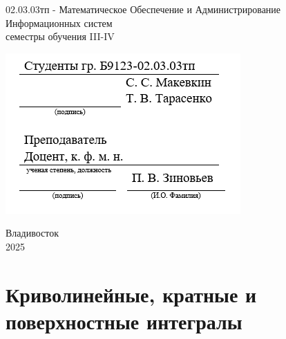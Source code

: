 \documentclass[12pt]{article}
\let\ORIincludegraphics\includegraphics
\renewcommand{\includegraphics}[2][]{\ORIincludegraphics[scale=0.65,#1]{#2}}
\begin{document}
\begin{titlepage}
\begin{center}
\begin{center}
              \normalsize{02.03.03тп - Математическое Обеспечение и Администрирование Информационных систем}\\
              \normalsize{семестры обучения III-IV}
            \end{center}
            \hfill \break
            \hfill \break
            \hfill \break
            \begin{flushright}
                \includegraphics[scale=1.5]{rospis.png}
            \end{flushright}
            \hfill \break
            
            \end{center}
            \hfill \break
            \normalsize{ 
            
            }
            \begin{center} Владивосток \\ 2025 \end{center}
            \thispagestyle{empty}
    \end{titlepage}
    \pagebreak
    \tableofcontents
    \pagebreak
  \section{Криволинейные, кратные и поверхностные интегралы}
\end{document}
